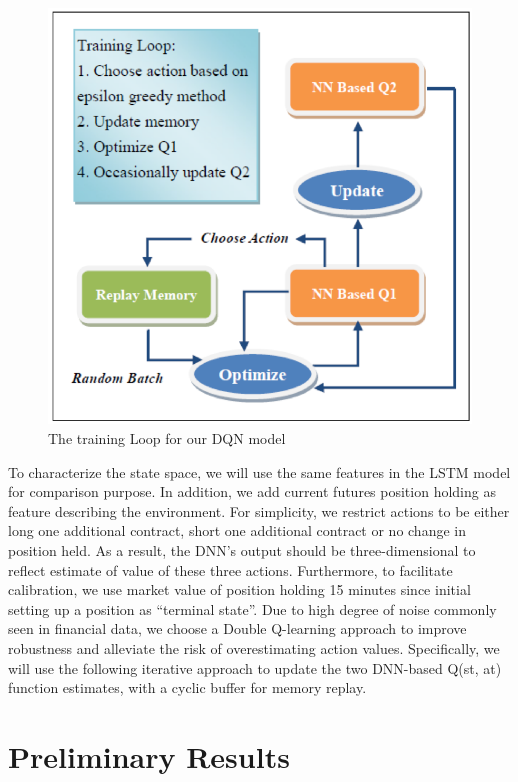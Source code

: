 \documentclass{article}
\begin{document}
\begin{figure}[h]
	\includegraphics[width=\linewidth]{rl_loop.png}
	\caption{The training Loop for our DQN model}
	\label{fig:rl_loop}
\end{figure}

To characterize the state space, we will use the same features in the LSTM model for comparison purpose. In addition, we add current futures position holding as feature describing the environment. For simplicity, we restrict actions to be either long one additional contract, short one additional contract or no change in position held. As a result, the DNN’s output should be three-dimensional to reflect estimate of value of these three actions. Furthermore, to facilitate calibration, we use market value of position holding 15 minutes since initial setting up a position as “terminal state”. Due to high degree of noise commonly seen in financial data, we choose a Double Q-learning approach to improve robustness and alleviate the risk of overestimating action values. Specifically, we will use the following iterative approach to update the two DNN-based Q(st, at) function estimates, with a cyclic buffer for memory replay. 

\section{Preliminary Results}
\end{document}
